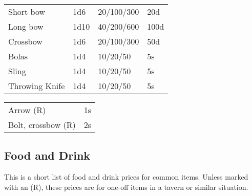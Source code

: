 \begin{center}
{
\begin{xtabular}{|l|l|l|l|}
Short bow & 1d6 & 20/100/300 & 20d \\
Long bow & 1d10 & 40/200/600 & 100d \\
Crossbow & 1d6 & 20/100/300 & 50d \\
Bolas & 1d4 & 10/20/50 & 5s \\
Sling & 1d4 & 10/20/50 & 5s \\
Throwing Knife & 1d4 & 10/20/50 & 5s \\
\hline
\end{xtabular}
}
\end{center}

\begin{center}
{
\begin{xtabular}{|l|l|}
Arrow (R) & 1s \\
Bolt, crossbow (R) & 2s \\
\hline
\end{xtabular}
}
\end{center}

\subsection{Food and Drink}

This is a short list of food and drink prices for common items.
Unless marked with an (R), these prices are for one-off items in
a tavern or similar situation.

